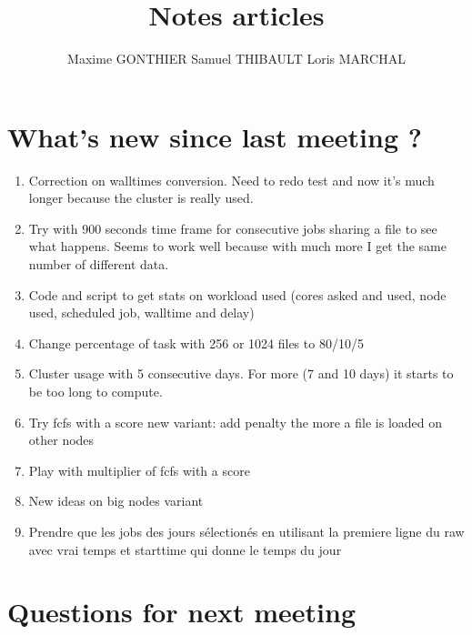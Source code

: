 \documentclass[a4paper]{article}
\title{Notes articles}
\author{Maxime GONTHIER Samuel THIBAULT Loris MARCHAL}
\begin{document}
\newpage

\section{What's new since last meeting ?}

	\begin{enumerate}
		\item Correction on walltimes conversion. Need to redo test and now it's much longer because the cluster is really used.
		\item Try with 900 seconds time frame for consecutive jobs sharing a file to see what happens. Seems to work well because with much more I get the same number of different data.
		\item Code and script to get stats on workload used (cores asked and used, node used, scheduled job, walltime and delay)
		\item Change percentage of task with 256 or 1024 files to 80/10/5
		\item Cluster usage with 5 consecutive days. For more (7 and 10 days) it starts to be too long to compute.
		\item Try fcfs with a score new variant: add penalty the more a file is loaded on other nodes
		\item Play with multiplier of fcfs with a score
		\item New ideas on big nodes variant
		\item Prendre que les jobs des jours sélectionés en utilisant la premiere ligne du raw avec vrai temps et starttime qui donne le temps du jour
	\end{enumerate}
	
\section{Questions for next meeting}
\end{document}
